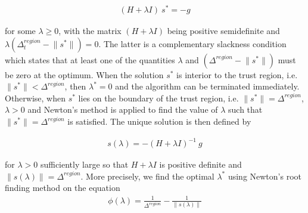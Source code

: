 

\begin{align}
    ( H + \lambda I ) \ s^* = - g
    \label{eq:exact-solution}
\end{align}

\noindent for some $\lambda \geq 0$, with the matrix $( H + \lambda I )$ being positive semidefinite and
$\lambda (\Delta^{region}_{t}  - \lVert s^* \rVert) = 0$. The latter is a complementary slackness condition
which states that at least one of the quantities $\lambda$ and $(\Delta^{region}  - \lVert s^* \rVert)$
must be zero at the optimum.
When the solution $s^*$ is interior to the trust region, i.e. $\lVert s^* \rVert < \Delta^{region}$,
then $\lambda^*= 0$ and the algorithm can be terminated immediately.
Otherwise, when $s^*$ lies on the boundary of the trust region, i.e. $\lVert s^* \rVert = \Delta^{region}$,
$\lambda > 0$ and Newton's method is applied to find the value of $\lambda$ such that
$\lVert s^* \rVert = \Delta^{region}$ is satisfied.
The unique solution is then defined by

\begin{align}
    s (\lambda) = -(H + \lambda I)^{-1} \ g
    \label{eq:boundary-solution}
\end{align}

\noindent for $\lambda> 0$ sufficiently large so that $H + \lambda I$ is positive definite and $ \lVert s (\lambda) \rVert = \Delta^{region}$.
More precisely, we find the optimal $\lambda^*$ using Newton's root finding method on the equation
\begin{align}
    \phi(\lambda)=\frac{1}{\Delta^{region}}-\frac{1}{\|s(\lambda)\|}
\end{align}

